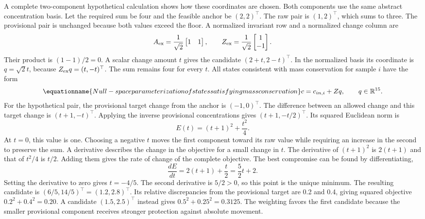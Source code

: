 A complete two-component hypothetical calculation shows how these coordinates are chosen. Both components use the same abstract concentration basis. Let the required sum be four and the feasible anchor be $(2,2)^\top$. The raw pair is $(1,2)^\top$, which sums to three. The provisional pair is unchanged because both values exceed the floor. A normalized invariant row and a normalized change column are
\[
A_{\rm ex}=\frac1{\sqrt2}\begin{bmatrix}1&1\end{bmatrix},\qquad
Z_{\rm ex}=\frac1{\sqrt2}\begin{bmatrix}1\\-1\end{bmatrix}.
\]
Their product is $(1-1)/2=0$. A scalar change amount $t$ gives the candidate $(2+t,2-t)^\top$. In the normalized basis its coordinate is $q=\sqrt2t$, because $Z_{\rm ex}q=(t,-t)^\top$. The sum remains four for every $t$. All states consistent with mass conservation for sample $i$ have the form
\begin{equation}
\equationname{Null-space parameterization of states satisfying mass conservation}
c=c_{in,i}+Zq,\qquad q\in\mathbb{R}^{15}.
\label{eq:projection_affine_parameterization}
\end{equation}
For the hypothetical pair, the provisional target change from the anchor is $(-1,0)^\top$. The difference between an allowed change and this target change is $(t+1,-t)^\top$. Applying the inverse provisional concentrations gives $(t+1,-t/2)^\top$. Its squared Euclidean norm is
\[
E(t)=(t+1)^2+\frac{t^2}{4}.
\]
At $t=0$, this value is one. Choosing a negative $t$ moves the first component toward its raw value while requiring an increase in the second to preserve the sum. A derivative describes the change in the objective for a small change in $t$. The derivative of $(t+1)^2$ is $2(t+1)$ and that of $t^2/4$ is $t/2$. Adding them gives the rate of change of the complete objective. The best compromise can be found by differentiating,
\[
\frac{dE}{dt}=2(t+1)+\frac t2=\frac52t+2.
\]
Setting the derivative to zero gives $t=-4/5$. The second derivative is $5/2>0$, so this point is the unique minimum. The resulting candidate is $(6/5,14/5)^\top=(1.2,2.8)^\top$. Its relative discrepancies from the provisional target are 0.2 and 0.4, giving squared objective $0.2^2+0.4^2=0.20$. A candidate $(1.5,2.5)^\top$ instead gives $0.5^2+0.25^2=0.3125$. The weighting favors the first candidate because the smaller provisional component receives stronger protection against absolute movement.

